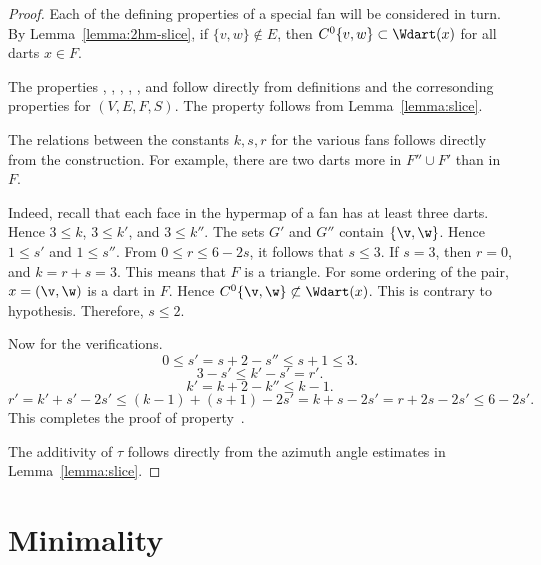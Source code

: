 \begin{proof} Each of the defining properties of a special fan will be
considered in turn.  By Lemma~\ref{lemma:2hm-slice}, if
$\{v,w\}\not\in E$, then $C^0\{v,w\}\subset \Wdart(x)$ for all darts
$x\in F$.

The properties , , ,
, , and  follow directly from
definitions and the corresonding properties for $(V,E,F,S)$.  The
property  follows from Lemma~\ref{lemma:slice}.

The relations between the constants $k,s,r$ for the various fans
follows directly from the construction.  For example, there are two
darts more in $F''\cup F'$ than in $F$.

  Indeed, recall that each face
in the hypermap of a fan has at least three darts.  Hence $3\le k$,
$3\le k'$, and $3\le k''$.  The sets $G'$ and $G''$ contain
$\{\v,\w\}$.  Hence $1\le s'$ and $1\le s''$.  From $0\le r\le 6 -
2s$, it follows that $s\le 3$.  If $s=3$, then $r=0$, and $k=r+s=3$.
This means that $F$ is a triangle.  For some ordering of the pair,
$x=(\v,\w)$ is a dart in $F$.  Hence $C^0\{\v,\w\} \not\subset
\Wdart(x)$.  This is contrary to hypothesis.  Therefore, $s\le 2$.

Now for the verifications.
\begin{displaymath}0\le s' = s + 2 - s'' \le s+1\le 3.\end{displaymath}
\begin{displaymath}3-s'\le k'-s' = r'.\end{displaymath}
\begin{displaymath}k' = k + 2 - k'' \le k-1.\end{displaymath}
\begin{displaymath}
  r'= k'+s' - 2 s' \le (k-1) + (s+1) - 2s' 
  =k+s - 2s' = r + 2s -2s' \le 6 - 2s'.
\end{displaymath}
This completes the proof of property~.

The additivity of $\tau$ follows directly from the azimuth angle
estimates in Lemma~\ref{lemma:slice}.
\end{proof}


\section{Minimality}




